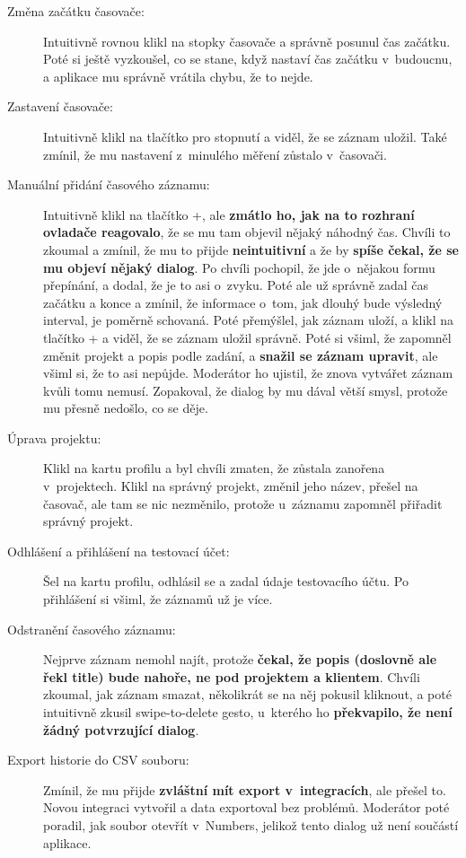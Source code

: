 \begin{description}
\item[Změna začátku časovače:] Intuitivně rovnou klikl na stopky časovače a správně posunul čas začátku. Poté si ještě vyzkoušel, co se stane, když nastaví čas začátku v~budoucnu, a aplikace mu správně vrátila chybu, že to nejde.
\item[Zastavení časovače:] Intuitivně klikl na tlačítko pro stopnutí a viděl, že se záznam uložil. Také zmínil, že mu nastavení z~minulého měření zůstalo v~časovači.
\item[Manuální přidání časového záznamu:] Intuitivně klikl na tlačítko +, ale \textbf{zmátlo ho, jak na to rozhraní ovladače reagovalo}, že se mu tam objevil nějaký náhodný čas. Chvíli to zkoumal a zmínil, že mu to přijde \textbf{neintuitivní} a že by \textbf{spíše čekal, že se mu objeví nějaký dialog}. Po chvíli pochopil, že jde o~nějakou formu přepínání, a dodal, že je to asi o~zvyku. Poté ale už správně zadal čas začátku a konce a zmínil, že informace o~tom, jak dlouhý bude výsledný interval, je poměrně schovaná. Poté přemýšlel, jak záznam uloží, a klikl na tlačítko + a viděl, že se záznam uložil správně. Poté si všiml, že zapomněl změnit projekt a popis podle zadání, a \textbf{snažil se záznam upravit}, ale všiml si, že to asi nepůjde. Moderátor ho ujistil, že znova vytvářet záznam kvůli tomu nemusí. Zopakoval, že dialog by mu dával větší smysl, protože mu přesně nedošlo, co se děje.
\item[Úprava projektu:] Klikl na kartu profilu a byl chvíli zmaten, že zůstala zanořena v~projektech. Klikl na správný projekt, změnil jeho název, přešel na časovač, ale tam se nic nezměnilo, protože u~záznamu zapomněl přiřadit správný projekt. 
\item[Odhlášení a přihlášení na testovací účet:] Šel na kartu profilu, odhlásil se a zadal údaje testovacího účtu. Po přihlášení si všiml, že záznamů už je více.
\item[Odstranění časového záznamu:] Nejprve záznam nemohl najít, protože \textbf{čekal, že popis (doslovně ale řekl title) bude nahoře, ne pod projektem a klientem}. Chvíli zkoumal, jak záznam smazat, několikrát se na něj pokusil kliknout, a poté intuitivně zkusil swipe-to-delete gesto, u~kterého ho \textbf{překvapilo, že není žádný potvrzující dialog}.
\item[Export historie do CSV souboru:] Zmínil, že mu přijde \textbf{zvláštní mít export v~integracích}, ale přešel to. Novou integraci vytvořil a data exportoval bez problémů. Moderátor poté poradil, jak soubor otevřít v~Numbers, jelikož tento dialog už není součástí aplikace.

\end{description}
